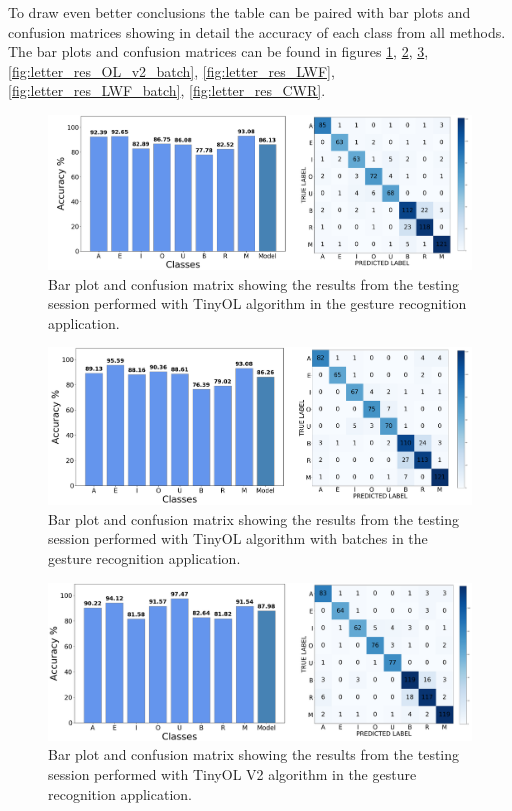 \documentclass[12pt]{report}
\begin{document}
To draw even better conclusions the table can be paired with bar plots and confusion matrices showing in detail the accuracy of each class from all methods. The bar plots and confusion matrices can be found in figures \ref{fig:letter_res_OL}, \ref{fig:letter_res_OL_batch}, \ref{fig:letter_res_OL_v2}, \ref{fig:letter_res_OL_v2_batch}, \ref{fig:letter_res_LWF}, \ref{fig:letter_res_LWF_batch}, \ref{fig:letter_res_CWR}.

\begin{figure}[h!]
    \centering
    \includegraphics[width=140mm]{Figures/Chapter5/STM_barPlot_OL.png} 

    \caption{Bar plot and confusion matrix showing the results from the testing session performed with TinyOL algorithm in the gesture recognition application.}
    \label{fig:letter_res_OL}    
\end{figure}

\begin{figure}[h!]
    \centering
    \includegraphics[width=140mm]{Figures/Chapter5/STM_barPlot_OL_batch.png} 
    \caption{Bar plot and confusion matrix showing the results from the testing session performed with TinyOL algorithm with batches in the gesture recognition application.}
    \label{fig:letter_res_OL_batch}    
\end{figure}

\begin{figure}[h!]
    \centering
    \includegraphics[width=140mm]{Figures/Chapter5/STM_barPlot_OL_V2.png} 
    \caption{Bar plot and confusion matrix showing the results from the testing session performed with TinyOL V2 algorithm in the gesture recognition application.}
    \label{fig:letter_res_OL_v2}    
\end{figure}
\end{document}
